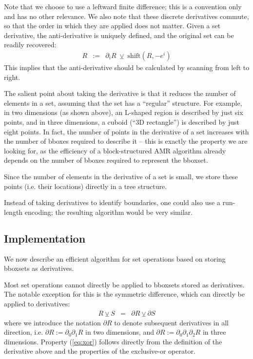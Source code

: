 \documentclass[conference]{IEEEtran}
\begin{document}
Note that we choose to use a leftward finite difference; this is a
convention only and has no other relevance. We also note that these
discrete derivatives commute, so that the order in which they are
applied does not matter. Given a set derivative, the anti-derivative
is uniquely defined, and the original set can be readily
recovered:
\begin{eqnarray}
  R & := & \partial_i R\; \veebar\; \mathrm{shift}(R, -e^i)
\end{eqnarray}
This implies that the anti-derivative should be calculated by scanning
from left to right.

The salient point about taking the derivative is that it reduces the
number of elements in a set, assuming that the set has a ``regular''
structure. For example, in two dimensions (as shown
above), an L-shaped region is described by just six points, and in
three dimensions, a cuboid (``3D rectangle'') is described by just eight
points. In fact, the number of points in the derivative of a set
increases with the number of bboxes required to describe it -- this is
exactly the property we are looking for, as the efficiency of a
block-structured AMR algorithm already depends on the number of bboxes
required to represent the bboxset.

Since the number of elements in the derivative of a set is small, we store
these points (i.e. their locations) directly in a tree structure.

Instead of taking derivatives to identify boundaries, one could also
use a run-length encoding; the resulting algorithm would be very
similar.

\subsection{Implementation}

We now describe an efficient algorithm for set operations based on
storing bboxsets as derivatives.

Most set
operations cannot directly be applied to bboxsets stored as
derivatives.
The notable exception for this is the symmetric difference, which can
directly be applied to derivatives:
\begin{eqnarray}
  \label{eq:xor}
  R \veebar S & = & \partial R \veebar \partial S
\end{eqnarray}
where we introduce the notation $\partial R$ to denote subsequent
derivatives in all direction, i.e. $\partial R := \partial_0
\partial_1 R$ in two dimensions, and $\partial R := \partial_0
\partial_1 \partial_2 R$ in three dimensions.
Property (\ref{eq:xor}) follows directly
from the definition of the derivative above and the properties of the
exclusive-or operator.
\end{document}
